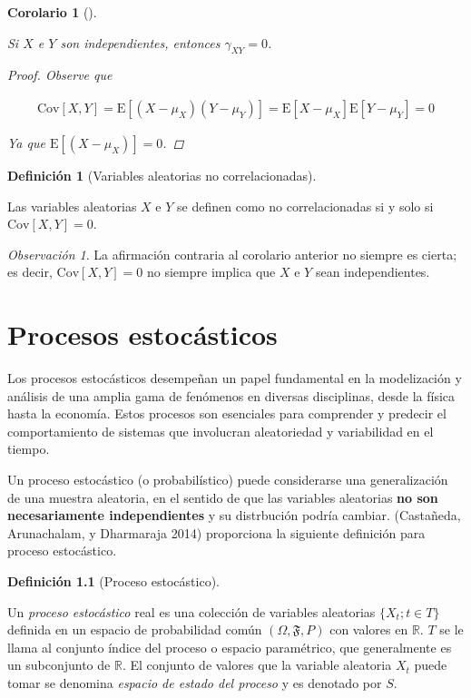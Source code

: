\documentclass[
  letterpaper,
  DIV=11,
  numbers=noendperiod]{scrreport}
\theoremstyle{plain}
\theoremstyle{definition}
\newtheorem{definition}{Definición}[chapter]
\theoremstyle{definition}
\theoremstyle{plain}
\newtheorem{corollary}{Corolario}[chapter]
\theoremstyle{remark}
\newtheorem*{remark}{Observación}
\begin{document}
\begin{corollary}[]\protect\hypertarget{cor-covind}{}\label{cor-covind}

Si \(X\) e \(Y\) son independientes, entonces \(\gamma_{XY}=0\).

\begin{proof}
Observe que

\[ \begin{split}\mathrm{Cov}[X,Y]=\mathrm E[(X-\mu_X)(Y-\mu_Y)]=\mathrm E[X-\mu_X]\mathrm E[Y-\mu_Y]=0\end{split} \]

Ya que \(\mathrm E[(X-\mu_X)]=0\).
\end{proof}

\end{corollary}

\begin{definition}[Variables aleatorias no
correlacionadas]\protect\hypertarget{def-uncorr}{}\label{def-uncorr}

Las variables aleatorias \(X\) e \(Y\) se definen como no
correlacionadas si y solo si \(\mathrm{Cov}[X,Y]=0\).

\end{definition}

\begin{remark}
La afirmación contraria al corolario anterior no siempre es cierta; es
decir, \(\mathrm{Cov}[X,Y]=0\) no siempre implica que \(X\) e \(Y\) sean
independientes.
\end{remark}

\chapter{Procesos estocásticos}\label{procesos-estocuxe1sticos}

Los procesos estocásticos desempeñan un papel fundamental en la
modelización y análisis de una amplia gama de fenómenos en diversas
disciplinas, desde la física hasta la economía. Estos procesos son
esenciales para comprender y predecir el comportamiento de sistemas que
involucran aleatoriedad y variabilidad en el tiempo.

Un proceso estocástico (o probabilístico) puede considerarse una
generalización de una muestra aleatoria, en el sentido de que las
variables aleatorias \textbf{no son necesariamente independientes} y su
distrbución podría cambiar. (Castañeda, Arunachalam, y Dharmaraja 2014)
proporciona la siguiente definición para proceso estocástico.

\begin{definition}[Proceso
estocástico]\protect\hypertarget{def-PE}{}\label{def-PE}

Un \emph{proceso estocástico} real es una colección de variables
aleatorias \(\{X_t; t\in T\}\) definida en un espacio de probabilidad
común \((\Omega, \mathfrak{F}, P)\) con valores en \(\mathbb{R}\). \(T\)
se le llama al conjunto índice del proceso o espacio paramétrico, que
generalmente es un subconjunto de \(\mathbb R\). El conjunto de valores
que la variable aleatoria \(X_t\) puede tomar se denomina \emph{espacio
de estado del proceso} y es denotado por \(S\).

\end{definition}
\end{document}

